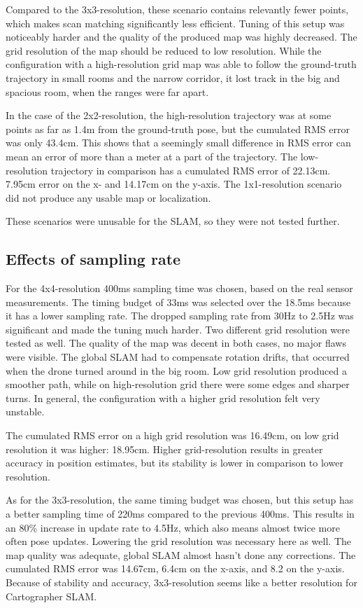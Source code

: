 \documentclass[conference]{IEEEtran}
\begin{document}
Compared to the 3x3-resolution, these scenario contains relevantly fewer points, which makes scan matching significantly less efficient. Tuning of this setup was noticeably harder and the quality of the produced map was highly decreased. The grid resolution of the map should be reduced to low resolution. While the configuration with a high-resolution grid map was able to follow the ground-truth trajectory in small rooms and the narrow corridor, it lost track in the big and spacious room, when the ranges were far apart. 

In the case of the 2x2-resolution, the high-resolution trajectory was at some points as far as 1.4m from the ground-truth pose, but the cumulated RMS error was only 43.4cm. This shows that a seemingly small difference in RMS error can mean an error of more than a meter at a part of the trajectory. The low-resolution trajectory in comparison has a cumulated RMS error of 22.13cm. 7.95cm error on the x- and 14.17cm on the y-axis. The 1x1-resolution scenario did not produce any usable map or localization. 

These scenarios were unusable for the SLAM, so they were  not tested further.  

\subsection{Effects of sampling rate}

For the 4x4-resolution 400ms sampling time was chosen, based on the real sensor measurements. The timing budget of 33ms was selected over the 18.5ms because it has a lower sampling rate. The dropped sampling rate from 30Hz to 2.5Hz was significant and made the tuning much harder. Two different grid resolution were tested as well. The quality of the map was decent in both cases, no major flaws were visible. The global SLAM had to compensate rotation drifts, that occurred when the drone turned around in the big room. Low grid resolution produced a smoother path, while on high-resolution grid there were some edges and sharper turns. In general, the configuration with a higher grid resolution felt very unstable. 

The cumulated RMS error on a high grid resolution was 16.49cm, on low grid resolution it was higher: 18.95cm. Higher grid-resolution results in greater accuracy in position estimates, but its stability is lower in comparison to lower resolution. 

As for the 3x3-resolution, the same timing budget was chosen, but this setup has a better sampling time of 220ms compared to the previous 400ms. This results in an 80\% increase in update rate to 4.5Hz, which also means almost twice more often pose updates. Lowering the grid resolution was necessary here as well. The map quality was adequate, global SLAM almost hasn't done any corrections. The cumulated RMS error was 14.67cm, 6.4cm on the x-axis, and 8.2 on the y-axis. Because of stability and accuracy, 3x3-resolution seems like a better resolution for Cartographer SLAM. 
\end{document}
